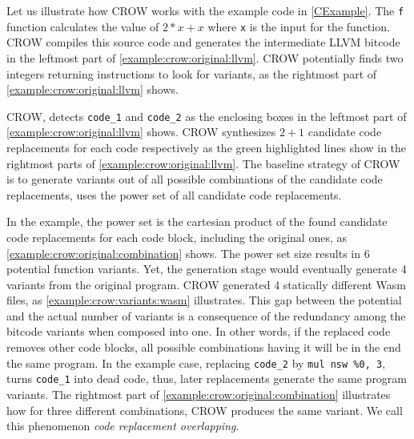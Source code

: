 \label{section:crow:example}

Let us illustrate how CROW works with the example code in \autoref{CExample}. The \texttt{f} function calculates the value of $2 * x + x$ where \texttt{x} is the input for the function.  CROW compiles this source code and generates the intermediate LLVM bitcode in the leftmost part of \autoref{example:crow:original:llvm}. CROW potentially finds two integers returning instructions to look for variants, as the rightmost part of \autoref{example:crow:original:llvm} shows.


    


\vspace{-0.15cm}

CROW, detects \texttt{code\_1} and \texttt{code\_2} as the enclosing boxes in the leftmost part of \autoref{example:crow:original:llvm} shows. CROW synthesizes $2 + 1$ candidate code replacements for each code respectively as the green highlighted lines show in the rightmost parts of \autoref{example:crow:original:llvm}.
The baseline strategy of CROW is to generate variants out of all possible combinations of the candidate code replacements, \ie uses the power set of all candidate code replacements.

In the example, the power set is the cartesian product of the found candidate code replacements for each code block, including the original ones, as \autoref{example:crow:original:combination} shows. The power set size results in $6$ potential function variants. Yet, the generation stage would eventually generate $4$ variants from the original program. CROW generated 4 statically different Wasm files, as \autoref{example:crow:variants:wasm} illustrates. This gap between the potential and the actual number of variants is a consequence of the redundancy among the bitcode variants when composed into one. In other words, if the replaced code removes other code blocks, all possible combinations having it will be in the end the same program. In the example case, replacing \texttt{code\_2} by \texttt{mul nsw \%0, 3}, turns \texttt{code\_1} into dead code, thus, later replacements generate the same program variants. The rightmost part of \autoref{example:crow:original:combination} illustrates how for three different combinations, CROW produces the same variant. We call this phenomenon \emph{code replacement overlapping}.


